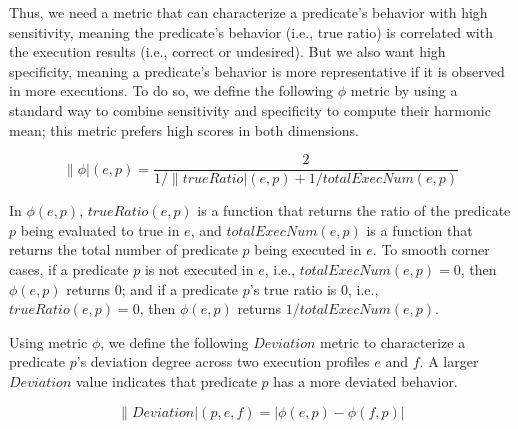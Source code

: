 


Thus, we need a metric that can characterize
a predicate's behavior with high sensitivity, meaning the predicate's
behavior (i.e., true ratio) is correlated with
the execution results (i.e., correct or undesired).
But we also want
high specificity, meaning a predicate's behavior
is more representative if it is observed
in more executions.
To do so, we define the following
$\phi$ metric by using a standard way to
combine sensitivity and specificity to compute their
harmonic mean; this metric prefers high scores in both dimensions. 

\vspace{-3mm}

{\small{
\[
\|\phi|(e, p) = \frac{2}{{1}/{\|trueRatio|(e, p)} + {1}/{totalExecNum(e, p)}}
\]
}}

\vspace{-3mm}

In $\phi(e, p)$, $trueRatio(e, p)$ is a function that returns the ratio of the predicate $p$ being
evaluated to true in $e$, and $totalExecNum(e, p)$ is a function
that returns the total number of predicate $p$ being executed in $e$.
To smooth corner cases, if a predicate $p$ is not executed in $e$, i.e., 
$totalExecNum(e, p) = 0$, then $\phi(e, p)$ returns 0; and if a predicate $p$'s true ratio is 0, i.e., $trueRatio(e, p) = 0$, then $\phi(e, p)$ returns
$1/totalExecNum(e, p)$.


Using metric $\phi$, we define the following $Deviation$ metric
to characterize a predicate $p$'s deviation degree across two execution
profiles $e$ and $f$. A larger $Deviation$ value indicates that
predicate $p$ has a more deviated behavior. %

\vspace{-2mm}

{\small{
\[
\|Deviation|(p, e, f) = |\phi(e, p) - \phi(f, p)|
\]
}}
\vspace{-4mm}

